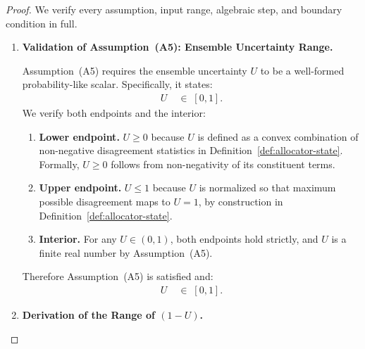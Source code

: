 \documentclass[12pt,openany]{book}
\numberwithin{equation}{chapter}
\theoremstyle{plain}
\theoremstyle{definition}
\theoremstyle{remark}
\numberwithin{equation}{chapter}
\theoremstyle{plain}
\begin{document}
\begin{proof}
We verify every assumption, input range, algebraic step, and boundary
condition in full.

\begin{enumerate}

  \item[\textup{(1)}] \textbf{Validation of Assumption~\textup{(A5)}:
        Ensemble Uncertainty Range.}

        Assumption~\textup{(A5)} requires the ensemble uncertainty
        $U$ to be a well-formed probability-like scalar.
        Specifically, it states:
        \begin{align}
          U &\;\in\; [0,1].
          \label{eq:U-range}
        \end{align}
        We verify both endpoints and the interior:
        \begin{enumerate}
          \item[\textup{(1a)}] \textbf{Lower endpoint.}
                $U \geq 0$ because $U$ is defined as a convex
                combination of non-negative disagreement
                statistics in
                Definition~\ref{def:allocator-state}.
                Formally, $U \geq 0$ follows from
                non-negativity of its constituent terms.
          \item[\textup{(1b)}] \textbf{Upper endpoint.}
                $U \leq 1$ because $U$ is normalized so that
                maximum possible disagreement maps to $U = 1$,
                by construction in
                Definition~\ref{def:allocator-state}.
          \item[\textup{(1c)}] \textbf{Interior.}
                For any $U \in (0,1)$, both endpoints hold
                strictly, and $U$ is a finite real number by
                Assumption~\textup{(A5)}.
        \end{enumerate}
        Therefore Assumption~\textup{(A5)} is satisfied and:
        \begin{align}
          U &\;\in\; [0,1].
          \label{eq:U-validated}
        \end{align}

  \item[\textup{(2)}] \textbf{Derivation of the Range of
        $(1-U)$.}


\end{enumerate}
\end{proof}
\end{document}
